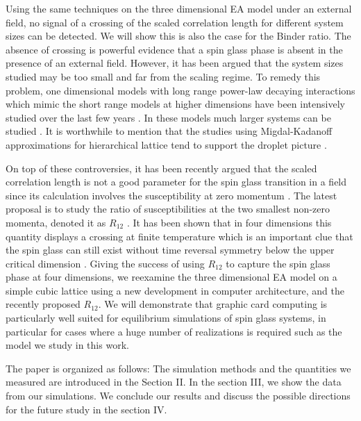 \documentclass[aps,prb,twocolumn,showpacs,superscriptaddress]{revtex4}
\begin{document}
Using the same techniques on the three dimensional EA model under an external field, no signal of 
a crossing of the scaled correlation length for different system sizes can be 
detected\cite{Young-Katzgraber2004}.  We will show this is also 
the case for the Binder ratio.  The absence of crossing is powerful evidence that a spin
glass phase is absent in the presence of an external field. However, it has been 
argued that the system sizes studied may be too small and far from the scaling 
regime. To remedy this problem, one dimensional models with long range power-law 
decaying interactions \cite{Kotliar-Anderson-Stein-1983} which mimic the short range models 
at higher dimensions have been intensively studied over the last few years \cite{Katzgraber-Young-2003a,Katzgraber-Young-2003b,
Leuzzi-1999}. In these models much larger systems can be studied \cite{Katzgraber-Larson-Young-2009,
Katzgraber-Hartmann-2009,Leuzzi-etal-2008,Larson-etal-2013}. It is worthwhile to mention that
the studies using Migdal-Kadanoff approximations for hierarchical lattice
tend to support the droplet picture \cite{Moore-Bokil-Drossel-1998,Migliorini-Berker-1998}. 

On top of these controversies, it has been recently argued that the scaled correlation length 
is not a good parameter for the spin glass transition in a field since its calculation involves 
the susceptibility at zero momentum \cite{Leuzzi-etal-2008}.
The latest proposal is to study the ratio of susceptibilities at the 
two smallest non-zero momenta, denoted it as $R_{12}$ \cite{Banos-2012}. It has 
been shown that in four dimensions this quantity displays a crossing
at finite temperature which is an important clue that the spin glass can still 
exist without time reversal symmetry below the upper critical dimension \cite{Banos-2012}. 
Giving the success of using $R_{12}$ to capture the spin glass phase
at four dimensions, we reexamine the three dimensional EA model on a simple cubic lattice using 
a new development in computer architecture, and the recently proposed $R_{12}$. 
We will demonstrate that graphic card computing is particularly well suited for 
equilibrium simulations of spin glass systems, in particular for cases where a huge number 
of realizations is required such as the model we study in this work. 

The paper is organized as follows: The simulation methods and the quantities we measured 
are introduced in the Section II. In the section III, we show the data from our simulations.
We conclude our results and discuss the possible directions for the future study in the
section IV.
\end{document}
